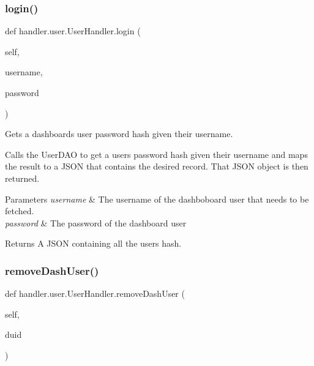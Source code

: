 \subsubsection{\texorpdfstring{login()}{login()}}
{\footnotesize\ttfamily def handler.\+user.\+User\+Handler.\+login (\begin{DoxyParamCaption}\item[{}]{self,  }\item[{}]{username,  }\item[{}]{password }\end{DoxyParamCaption})}



Gets a dashboard\textquotesingle{}s user password hash given their username. 

Calls the User\+D\+AO to get a user\textquotesingle{}s password hash given their username and maps the result to a J\+S\+ON that contains the desired record. That J\+S\+ON object is then returned.


\begin{DoxyParams}{Parameters}
{\em username} & The username of the dashboboard user that needs to be fetched. \\
\hline
{\em password} & The password of the dashboard user \\
\hline
\end{DoxyParams}
\begin{DoxyReturn}{Returns}
A J\+S\+ON containing all the user\textquotesingle{}s hash. 
\end{DoxyReturn}
\mbox{\label{classhandler_1_1user_1_1_user_handler_ac698bb4b5305f31845db90f0932e95ad}} 
\subsubsection{\texorpdfstring{remove\+Dash\+User()}{removeDashUser()}}
{\footnotesize\ttfamily def handler.\+user.\+User\+Handler.\+remove\+Dash\+User (\begin{DoxyParamCaption}\item[{}]{self,  }\item[{}]{duid }\end{DoxyParamCaption})}



